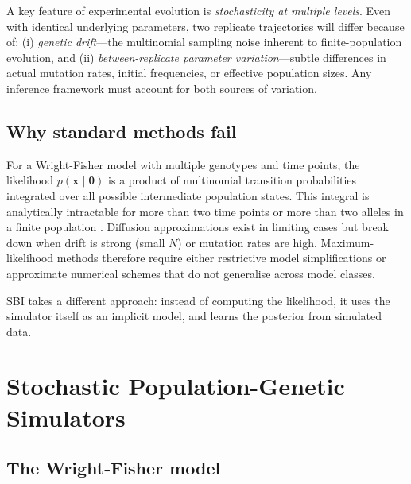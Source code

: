 \documentclass[11pt]{article}
\newcommand{\btheta}{\boldsymbol{\theta}}
\newcommand{\bx}{\mathbf{x}}
\begin{document}
A key feature of experimental evolution is \emph{stochasticity at multiple
levels}.
Even with identical underlying parameters, two replicate trajectories will
differ because of:
(i) \emph{genetic drift}---the multinomial sampling noise inherent to
finite-population evolution, and
(ii) \emph{between-replicate parameter variation}---subtle differences in
actual mutation rates, initial frequencies, or effective population sizes.
Any inference framework must account for both sources of variation.

\subsection{Why standard methods fail}

For a Wright-Fisher model with multiple genotypes and time points, the
likelihood $p(\bx \mid \btheta)$ is a product of multinomial transition
probabilities integrated over all possible intermediate population states.
This integral is analytically intractable for more than two time points or
more than two alleles in a finite population \citep{tataru2017statistical}.
Diffusion approximations exist in limiting cases but break down when drift is
strong (small $N$) or mutation rates are high.
Maximum-likelihood methods therefore require either restrictive model
simplifications or approximate numerical schemes that do not generalise across
model classes.

SBI takes a different approach: instead of computing the likelihood, it uses
the simulator itself as an implicit model, and learns the posterior from
simulated data.

\section{Stochastic Population-Genetic Simulators}
\label{sec:simulators}

\subsection{The Wright-Fisher model}
\label{sec:wf}
\end{document}
